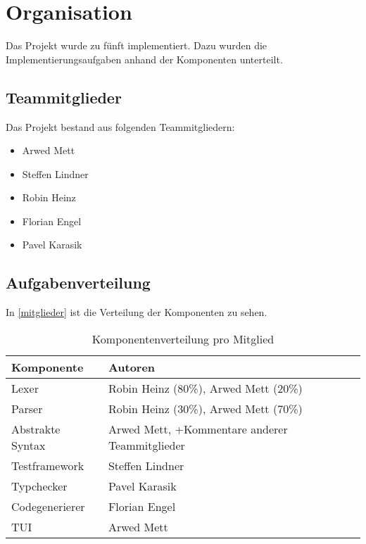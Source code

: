 \chapter{Organisation}

Das Projekt wurde zu fünft implementiert.
Dazu wurden die Implementierungsaufgaben anhand der Komponenten unterteilt.

\section{Teammitglieder}

Das Projekt bestand aus folgenden Teammitgliedern:
\begin{itemize}
	\item Arwed Mett
	\item Steffen Lindner
	\item Robin Heinz
	\item Florian Engel
	\item Pavel Karasik
\end{itemize}

\section{Aufgabenverteilung}

In \autoref{mitglieder} ist die Verteilung der Komponenten zu sehen.

\begin{table}[H]
	\centering
	\begin{tabular}{l|l}
		\textbf{Komponente} & \textbf{Autoren}\\
		\hline
		Lexer & Robin Heinz (80\%), Arwed Mett (20\%)\\
		Parser & Robin Heinz (30\%), Arwed Mett (70\%)\\
		Abstrakte Syntax & Arwed Mett, +Kommentare anderer Teammitglieder\\
		Testframework & Steffen Lindner\\
		Typchecker & Pavel Karasik\\
		Codegenerierer & Florian Engel\\
		\ac{TUI} & Arwed Mett\\
	\end{tabular}
	\caption{Komponentenverteilung pro Mitglied}
	\label{mitglieder}
\end{table}


